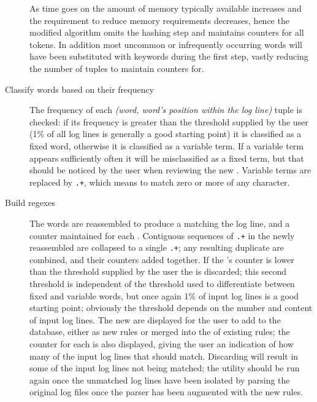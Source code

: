 \begin{description}
        As time goes on the amount of memory typically available increases
        and the requirement to reduce memory requirements decreases, hence
        the modified algorithm omits the hashing step and maintains
        counters for all tokens. In addition most uncommon or infrequently
        occurring words will have been substituted with keywords during the
        first step, vastly reducing the number of tuples to maintain
        counters for.

    \item [Classify words based on their frequency]  The frequency of each
        \textit{(word, word's position within the log line)\/} tuple is
        checked: if its frequency is greater than the threshold supplied by
        the user (1\% of all log lines is generally a good starting point)
        it is classified as a fixed word, otherwise it is classified as a
        variable term.  If a variable term appears sufficiently often it
        will be misclassified as a fixed term, but that should be noticed
        by the user when reviewing the new \regexes{}.  Variable terms are
        replaced by \texttt{.+}, which means to match zero or more of any
        character.  

    \item [Build regexes]  The words are reassembled to produce a \regex{}
        matching the log line, and a counter maintained for each \regex{}.
        Contiguous sequences of \texttt{.+} in the newly reassembled
        \regexes{} are collapsed to a single \texttt{.+}; any resulting
        duplicate \regexes{} are combined, and their counters added
        together.  If the \regex{}'s counter is lower than the threshold
        supplied by the user the \regex{} is discarded; this second
        threshold is independent of the threshold used to differentiate
        between fixed and variable words, but once again 1\% of input log
        lines is a good starting point; obviously the threshold depends on
        the number and content of input log lines.  The new \regexes{} are
        displayed for the user to add to the database, either as new rules
        or merged into the \regexes{} of existing rules; the counter for
        each \regex{} is also displayed, giving the user an indication of
        how many of the input log lines that \regex{} should match.
        Discarding \regexes{} will result in some of the input log lines
        not being matched; the utility should be run again once the
        unmatched log lines have been isolated by parsing the original log
        files once the parser has been augmented with the new rules.

\end{description}

